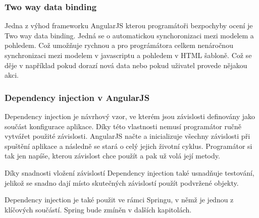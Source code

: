 \documentclass[czech,master,public,dept460,male,cpdeclaration,twoside]{diploma}
\begin{document}
\subsubsection{Two way data binding}
Jedna z výhod frameworku AngularJS kterou programátoři bezpochyby ocení je Two way data binding. Jedná se o automatickou synchoronizaci mezi modelem a pohledem. Což umožňuje rychnou a pro prográmátora celkem nenáročnou synchronizaci mezi modelem v javascriptu a pohledem v HTML šabloně. Což se děje v například pokud dorazí nová data nebo pokud uživatel provede nějakou akci. \cite{databinding}

\subsubsection{Dependency injection v AngularJS}
Dependency injection je návrhový vzor, ve kterém jsou závislosti definovány jako součást konfigurace aplikace. Díky této vlastnosti nemusí programátor ručně vytvářet použité závislosti. AngularJS načte a inicializuje všechny závislosti při spuštění aplikace a následně se stará o celý jejich životní cyklus. Programátor si tak jen napíše, kterou závislost chce použít a pak už volá její metody.

Díky snadnosti vložení závislostí Dependency injection také usnadňuje testování, jelikož se snadno dají místo skutečných závislostí použít podvržené objekty.

Dependency injection je také použit ve rámci Springu, v němž je jednou z klíčových součástí. Spring bude zmíněn v dalších kapitolách. \cite{LearningAngularjs}
\end{document}
